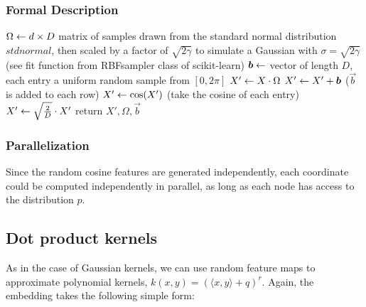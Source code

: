 \subsubsection{Formal Description}

\begin{algorithm}

\begin{algorithmic}[1]
	\State $\Omega \leftarrow d\times D $ matrix of samples drawn from the standard normal distribution $ stdnormal$, then scaled by a factor of $\sqrt{2\gamma}$ to simulate a Gaussian with $\sigma=\sqrt{2\gamma}$ (see fit function from RBFsampler class of scikit-learn)
	\State $\boldsymbol{b} \leftarrow$ vector of length $D$, each entry a uniform random sample from $[0,2\pi]$
	\State $X' \leftarrow  X\cdot \Omega$
	\State $X' \leftarrow X' + \boldsymbol{b} $ ($\vec{b}$ is added to each row)
	\State $X' \leftarrow \cos(X')$ (take the cosine of each entry)
	\State $X' \leftarrow \sqrt{\frac{2}{D}}\cdot X'$
	\State return $X', \Omega, \vec{b}$
\end{algorithmic}

\end{algorithm}


\subsubsection{Parallelization}
Since the random cosine features are generated independently, each coordinate could be computed independently in parallel, as long as each node has access to the distribution $p$.


\subsection{Dot product kernels}


As in the case of Gaussian kernels, we can use random feature maps to approximate polynomial kernels,  $k(x,y)=(\langle x,y\rangle+q)^r$. Again, the embedding takes the following simple form:

